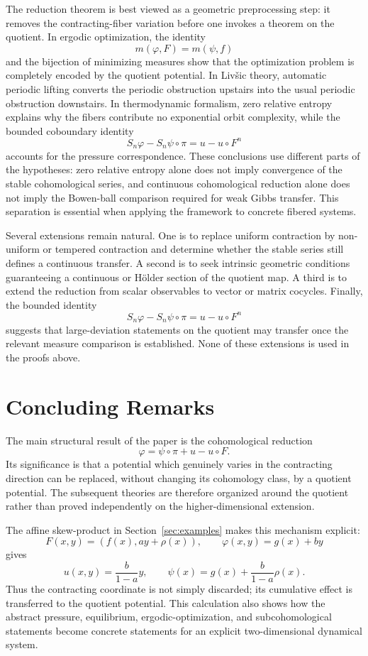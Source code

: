 \documentclass[11pt,a4paper]{article}
\begin{document}
The reduction theorem is best viewed as a geometric preprocessing step: it
removes the contracting-fiber variation before one invokes a theorem on the
quotient. In ergodic optimization, the identity
\[
 m(\varphi,F)=m(\psi,f)
\]
and the bijection of minimizing measures show that the optimization problem is
completely encoded by the quotient potential. In Liv\v{s}ic theory, automatic
periodic lifting converts the periodic obstruction upstairs into the usual
periodic obstruction downstairs. In thermodynamic formalism, zero relative
entropy explains why the fibers contribute no exponential orbit complexity,
while the bounded coboundary identity
\[
 S_n\varphi-S_n\psi\circ\pi=u-u\circ F^n
\]
accounts for the pressure correspondence. These conclusions use different
parts of the hypotheses: zero relative entropy alone does not imply convergence
of the stable cohomological series, and continuous cohomological reduction
alone does not imply the Bowen-ball comparison required for weak Gibbs
transfer. This separation is essential when applying the framework to concrete
fibered systems.

Several extensions remain natural. One is to replace uniform contraction by
non-uniform or tempered contraction and determine whether the stable series
still defines a continuous transfer. A second is to seek intrinsic geometric
conditions guaranteeing a continuous or H\"older section of the quotient
map. A third is to extend the reduction from scalar observables to vector or
matrix cocycles. Finally, the bounded identity
\[
S_n\varphi-S_n\psi\circ\pi=u-u\circ F^n
\]
suggests that large-deviation statements on the quotient may transfer once
the relevant measure comparison is established. None of these extensions is
used in the proofs above.

\section{Concluding Remarks}

The main structural result of the paper is the cohomological reduction
\[
\boxed{
\varphi=\psi\circ\pi+u-u\circ F.
}
\]
Its significance is that a potential which genuinely varies in the
contracting direction can be replaced, without changing its cohomology
class, by a quotient potential. The subsequent theories are therefore
organized around the quotient rather than proved independently on the
higher-dimensional extension.

The affine skew-product in Section~\ref{sec:examples} makes this mechanism
explicit:
\[
F(x,y)=(f(x),ay+\rho(x)),
\qquad
\varphi(x,y)=g(x)+by
\]
gives
\[
u(x,y)=\frac{b}{1-a}y,
\qquad
\psi(x)=g(x)+\frac{b}{1-a}\rho(x).
\]
Thus the contracting coordinate is not simply discarded; its cumulative
effect is transferred to the quotient potential. This calculation also
shows how the abstract pressure, equilibrium, ergodic-optimization, and
subcohomological statements become concrete statements for an explicit
two-dimensional dynamical system.
\end{document}
